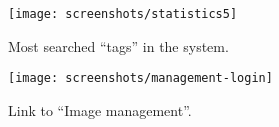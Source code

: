\begin{figure}[h]
  \begin{center}
    \leavevmode
    \texttt{[image: screenshots/statistics5]}
    \caption{Most searched ``tags'' in the system.}
    \label{fig:mostsearched-tags}
  \end{center}
\end{figure}

\begin{figure}[h]
  \begin{center}
    \leavevmode
    \texttt{[image: screenshots/management-login]}
    \caption{Link to ``Image management''.}
    \label{fig:management-login}
  \end{center}
\end{figure}
